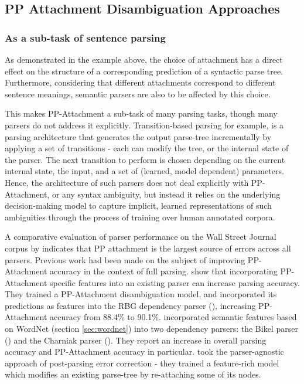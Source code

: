 \subsection{PP Attachment Disambiguation Approaches}

\subsubsection{As a sub-task of sentence parsing}
As demonstrated in the example above, the choice of attachment has a direct effect on the structure of a corresponding prediction of a syntactic parse tree. Furthermore, considering that different attachments correspond to different sentence meanings, semantic parsers are also to be affected by this choice. 

This makes PP-Attachment a sub-task of many parsing tasks, though many parsers do not address it explicitly. Transition-based parsing for example, is a parsing architecture that generates the output parse-tree incrementally by applying a set of transitions - each can modify the tree, or the internal state of the parser. The next transition to perform is chosen depending on the current internal state, the input, and a set of (learned, model dependent) parameters. Hence, the architecture of such parsers does not deal explicitly with PP-Attachment, or any syntax ambiguity, but instead it relies on the underlying decision-making model to capture implicit, learned representations of such ambiguities through the process of training over human annotated corpora. 


A comparative evaluation of parser performance on the Wall Street Journal corpus by \cite{kummerfeld12parser} indicates that PP attachment is the largest source of errors across all parsers.  Previous work had been made on the subject of improving PP-Attachment accuracy in the context of full parsing. \cite{hpcd} show that incorporating PP-Attachment specific features into an existing parser can increase parsing accuracy. They trained a PP-Attachment disambiguation model, and incorporated its predictions as features into the RBG dependency parser (\cite{lei-etal-14-low}), increasing PP-Attachment accuracy from 88.4\% to 90.1\%.  \cite{agirre-etal-08-improving} incorporated semantic features based on WordNet (section \ref{sec:wordnet}) into two dependency parsers: the Bikel parser (\cite{bikel}) and the Charniak parser (\cite{charniak}). They report an increase in overall parsing accuracy and PP-Attachment accuracy in particular. \cite{henestrozaanguiano:hal-00602083} took the parser-agnostic approach of post-parsing error correction - they trained a feature-rich model which modifies an existing parse-tree by re-attaching some of its nodes. 


